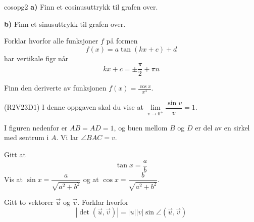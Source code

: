 \newpage
{}
\vspace{-10 pt}
{cosopg2}
\vs
\textbf{a)} Finn et cosinusuttrykk til grafen over.\os

\textbf{b)} Finn et sinusuttrykk til grafen over.


Forklar hvorfor alle funksjoner $ f $ på formen
\[ f(x)= a \tan (kx+c)+d\]
har vertikale figr når
\[ kx+c=\pm \frac{\pi}{2}+\pi n \]

Finn den deriverte av funksjonen $ f(x)=\frac{\cos x}{x^4} $.
\newpage

(R2V23D1)\os
I denne oppgaven skal du vise at $ \lim\limits_{v\to 0^+} \dfrac{\sin v}{v}=1 $.\os

I figuren nedenfor er $ AB=AD=1 $, og buen mellom $ B $ og $ D $ er del av en sirkel med sentrum i $ A $. Vi lar $ \angle BAC=v $.

Gitt at
\[ \tan x = \frac{a}{b} \]
Vis at $ \sin x = \dfrac{a}{\sqrt{a^2+b^2}} $ og at $ \cos x = \dfrac{b}{\sqrt{a^2+b^2}} $.

Gitt to vektorer $ \vec{u} $ og $ \vec{v} $. Forklar hvorfor
\[ |\det(\vec{u}, \vec{v})|=|u||v|\sin\angle(\vec{u}, \vec{v}) \]

\begin{comment}

\ekspop
I denne oppgaven skal vi komme fram til to viktige resultater, nemlig at:
\alg{
\lim\limits_{x\to 0}\frac{\sin x}{x}&=1 \\ &\\
\lim\limits_{x\to 0}\frac{\cos x-1}{x}&=0 	
}
Når vi i \textsl{Kapittel 6} finner den deriverte av $ \sin x $ og $ \cos x $, brukes blant annet disse resultatene.
\begin{figure}[H]
\centering
\texttt{[image: \\asym\{sinx]}}
\end{figure}
a) Bruk formlikhet til å vise at $ \tan x $ er høyden i figuren over.

b) Forklar hvorfor vi må ha at:
\[ \frac{\sin x}{x}<1 \]
c) Buen $ x $ utgjør $ \frac{x}{2\pi} $ av omkretsen til enhetssirkelen. Vis at arealet av sektoren til $ x $ blir $ \frac{1}{2}x $.

d) Forklar hvorfor vi må ha at:
\alg{
\frac{1}{2}x&<\frac{1}{2}\tan x	\\
x&<\tan x	
}
e) Bruk ulikhetene fra \textsl{b} og \textsl{d} til å vise at:
\[ \lim\limits_{x\to 0} \frac{\sin x}{x} =1 \]

f) Vis at:
\[\lim\limits_{x\to 0} \frac{\cos x-1}{x}=0 \]
\big(Hint: Multipliser ligningen med $ \frac{\cos x+1}{\cos x+1} $ og bruk deretter det du fant i $ e $.\big) \\
\end{comment}

